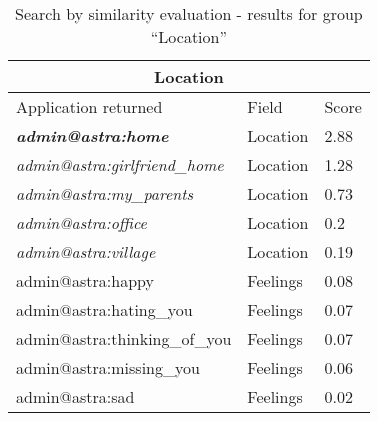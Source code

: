 \begin{table}[h!]
	\tiny
    \begin{center}
		\begin{tabular}{||l|l|l||}

		\hline \hline
		\multicolumn{3}{||c||}{\bfseries{Location}} \\
		\hline \hline
			Application returned & Field & Score \\
			\hline \hline
			
			\textit{\textbf{admin@astra:home}}	&	Location	&	2.88	\\
			\hline
			\textit{admin@astra:girlfriend\_home}	&	Location	&	1.28	\\
			\hline
			\textit{admin@astra:my\_parents}	&	Location	&	0.73	\\
			\hline
			\textit{admin@astra:office}	&	Location	&	0.2	\\
			\hline
			\textit{admin@astra:village}	&	Location	&	0.19	\\
			\hline
			admin@astra:happy	&	Feelings	&	0.08	\\
			\hline
			admin@astra:hating\_you	&	Feelings	&	0.07	\\
			\hline
			admin@astra:thinking\_of\_you	&	Feelings	&	0.07	\\
			\hline
			admin@astra:missing\_you	&	Feelings	&	0.06	\\
			\hline
			admin@astra:sad	&	Feelings	&	0.02	\\

		\hline \hline

		\end{tabular}
		\caption{\label{table:testing-results-location}Search by similarity evaluation
		- results for group ``Location''}
	\end{center}
\end{table} 



